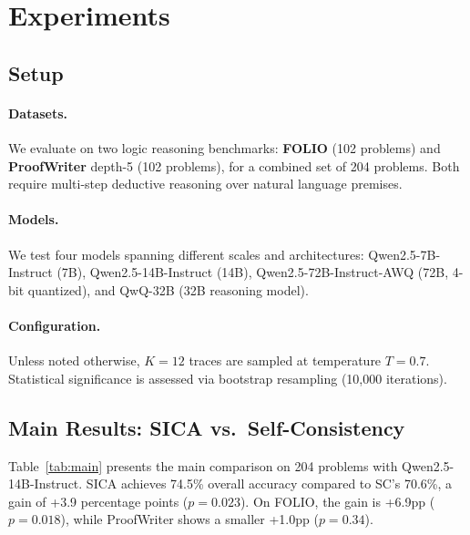 \documentclass[11pt,a4paper]{article}
\begin{document}
\section{Experiments}
\label{sec:experiments}

\subsection{Setup}

\paragraph{Datasets.} We evaluate on two logic reasoning benchmarks: \textbf{FOLIO} (102 problems) and \textbf{ProofWriter} depth-5 (102 problems), for a combined set of 204 problems. Both require multi-step deductive reasoning over natural language premises.

\paragraph{Models.} We test four models spanning different scales and architectures: Qwen2.5-7B-Instruct (7B), Qwen2.5-14B-Instruct (14B), Qwen2.5-72B-Instruct-AWQ (72B, 4-bit quantized), and QwQ-32B (32B reasoning model).

\paragraph{Configuration.} Unless noted otherwise, $K=12$ traces are sampled at temperature $T=0.7$. Statistical significance is assessed via bootstrap resampling (10,000 iterations).

\subsection{Main Results: SICA vs.\ Self-Consistency}
\label{sec:main_results}

Table~\ref{tab:main} presents the main comparison on 204 problems with Qwen2.5-14B-Instruct. SICA achieves 74.5\% overall accuracy compared to SC's 70.6\%, a gain of +3.9 percentage points ($p=0.023$). On FOLIO, the gain is +6.9pp ($p=0.018$), while ProofWriter shows a smaller +1.0pp ($p=0.34$).
\end{document}
